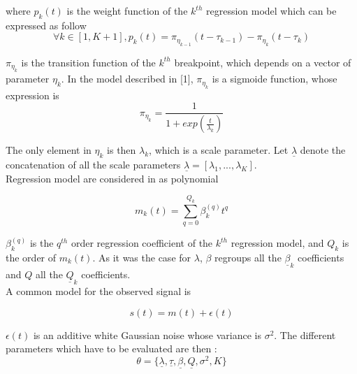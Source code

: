 where $p_k(t)$ is the weight function of the $k^{th}$ regression model which can be expressed as follow
\begin{equation}
\forall k\in [1,K+1], p_k(t)= \pi_{\eta_{k-1}}(t-\tau_{k-1})-\pi_{\eta_{k}}(t-\tau_{k})
\end{equation}

$\pi_{\eta_{k}}$ is the transition function of the $k^{th}$ breakpoint, which depends on a vector of parameter $\eta_{k}$. In the model described in [1], $\pi_{\eta_{k}}$ is a sigmoide function, whose expression is 
\begin{equation}
\pi_{\eta_{k}} = \frac{1}{1+exp(\frac{t}{\lambda_k})}
\end{equation}

The only element in $\eta_{k}$ is then $\lambda_k$, which is a scale parameter. Let $\underline{\lambda}$ denote the concatenation of all the scale parameters $\underline{\lambda} = [\lambda_1,...,\lambda_K]$.
\\

 Regression model are considered in \cite{research2} as polynomial 

\begin{equation}
m_k(t)= \sum_{q=0}^{Q_k} \beta^{(q)} _kt^q
\end{equation}

$\beta^{(q)} _k$ is the $q^{th}$ order regression coefficient of the $k^{th}$ regression model, and $Q_k$ is the order of $m_k(t)$. As it was the case for $\lambda$, $\beta$ regroups all the $\underline{\beta}_k$ coefficients and $Q$ all the $\underline{Q}_k$ coefficients.
\\

A common model for the observed signal is 


\begin{equation}
s(t)=m(t) + \epsilon (t)
\end{equation}

$\epsilon (t)$ is an additive white Gaussian noise whose variance is $\sigma^2$. The different parameters which have to be evaluated are then :
\begin{equation}
\theta=\{\underline{\lambda},\underline{\tau},\underline{\beta},\underline{Q},\sigma ^2,K\}
\end{equation}
\\


